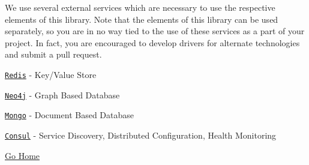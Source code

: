 We use several external services which are necessary to use the respective elements of this library. Note that the elements of this library can be used separately, so you are in no way tied to the use of these services as a part of your project. In fact, you are encouraged to develop drivers for alternate technologies and submit a pull request.


\begin{DoxyItemize}
\item \href{http://redis.io/}{\tt Redis} -\/ Key/\+Value Store
\item \href{https://neo4j.com}{\tt Neo4j} -\/ Graph Based Database
\item \href{https://www.mongodb.com}{\tt Mongo} -\/ Document Based Database
\item \href{https://www.consul.io/}{\tt Consul} -\/ Service Discovery, Distributed Configuration, Health Monitoring
\end{DoxyItemize}

\hyperlink{index}{Go Home} 